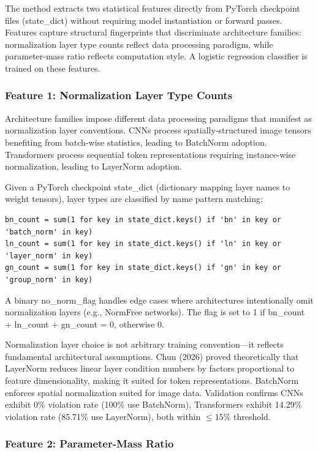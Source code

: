 
The method extracts two statistical features directly from PyTorch checkpoint files (state\_dict) without requiring model instantiation or forward passes. Features capture structural fingerprints that discriminate architecture families: normalization layer type counts reflect data processing paradigm, while parameter-mass ratio reflects computation style. A logistic regression classifier is trained on these features.

\subsubsection{Feature 1: Normalization Layer Type Counts}

Architecture families impose different data processing paradigms that manifest as normalization layer conventions. CNNs process spatially-structured image tensors benefiting from batch-wise statistics, leading to BatchNorm adoption. Transformers process sequential token representations requiring instance-wise normalization, leading to LayerNorm adoption.

Given a PyTorch checkpoint state\_dict (dictionary mapping layer names to weight tensors), layer types are classified by name pattern matching:

\begin{verbatim}
bn_count = sum(1 for key in state_dict.keys() if 'bn' in key or 'batch_norm' in key)
ln_count = sum(1 for key in state_dict.keys() if 'ln' in key or 'layer_norm' in key)
gn_count = sum(1 for key in state_dict.keys() if 'gn' in key or 'group_norm' in key)
\end{verbatim}

A binary no\_norm\_flag handles edge cases where architectures intentionally omit normalization layers (e.g., NormFree networks). The flag is set to 1 if bn\_count + ln\_count + gn\_count = 0, otherwise 0.

Normalization layer choice is not arbitrary training convention---it reflects fundamental architectural assumptions. Chun (2026) proved theoretically that LayerNorm reduces linear layer condition numbers by factors proportional to feature dimensionality, making it suited for token representations. BatchNorm enforces spatial normalization suited for image data. Validation confirms CNNs exhibit 0\% violation rate (100\% use BatchNorm), Transformers exhibit 14.29\% violation rate (85.71\% use LayerNorm), both within $\leq 15$\% threshold.

\subsubsection{Feature 2: Parameter-Mass Ratio}

